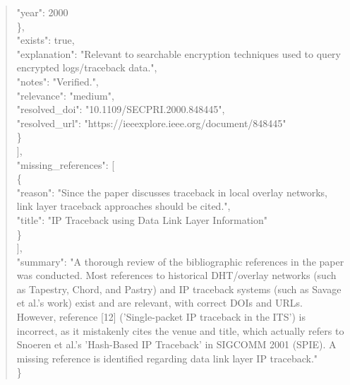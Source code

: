 \documentclass[11pt]{article}
\begin{document}
\begin{quote}
        "year": 2000\\
      \},\\
      "exists": true,\\
      "explanation": "Relevant to searchable encryption techniques used to query encrypted logs/traceback data.",\\
      "notes": "Verified.",\\
      "relevance": "medium",\\
      "resolved\_doi": "10.1109/SECPRI.2000.848445",\\
      "resolved\_url": "https://ieeexplore.ieee.org/document/848445"\\
    \}\\
  ],\\
  "missing\_references": [\\
    \{\\
      "reason": "Since the paper discusses traceback in local overlay networks, link layer traceback approaches should be cited.",\\
      "title": "IP Traceback using Data Link Layer Information"\\
    \}\\
  ],\\
  "summary": "A thorough review of the bibliographic references in the paper was conducted. Most references to historical DHT/overlay networks (such as Tapestry, Chord, and Pastry) and IP traceback systems (such as Savage et al.'s work) exist and are relevant, with correct DOIs and URLs. However, reference [12] ('Single-packet IP traceback in the ITS') is incorrect, as it mistakenly cites the venue and title, which actually refers to Snoeren et al.'s 'Hash-Based IP Traceback' in SIGCOMM 2001 (SPIE). A missing reference is identified regarding data link layer IP traceback."\\
\}\\
\end{quote}
\end{document}
